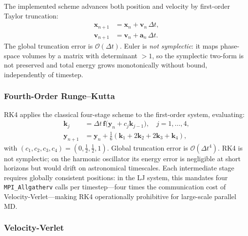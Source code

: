 \documentclass[10pt,twocolumn]{article}
\begin{document}
The implemented scheme advances both position and velocity by first-order
Taylor truncation:
\begin{align}
  \mathbf{x}_{n+1} &= \mathbf{x}_n + \mathbf{v}_n\,\Delta t, \label{eq:euler_x}\\
  \mathbf{v}_{n+1} &= \mathbf{v}_n + \mathbf{a}_n\,\Delta t. \label{eq:euler_v}
\end{align}
The global truncation error is $\mathcal{O}(\Delta t)$.
Euler is \emph{not symplectic}: it maps phase-space volumes by a matrix with
determinant $>1$, so the symplectic two-form is not preserved and total energy
grows monotonically without bound, independently of timestep.

\subsubsection{Fourth-Order Runge--Kutta}

RK4 applies the classical four-stage scheme to the first-order system,
evaluating:
\begin{align}
  \mathbf{k}_j &= \Delta t\,\mathbf{f}\bigl(\mathbf{y}_n + c_j\mathbf{k}_{j-1}\bigr),
    \quad j=1,\ldots,4, \label{eq:rk4}\\
  \mathbf{y}_{n+1} &= \mathbf{y}_n + \tfrac{1}{6}(\mathbf{k}_1
    + 2\mathbf{k}_2 + 2\mathbf{k}_3 + \mathbf{k}_4), \nonumber
\end{align}
with $(c_1,c_2,c_3,c_4)=(0,\tfrac{1}{2},\tfrac{1}{2},1)$.
Global truncation error is $\mathcal{O}(\Delta t^4)$.
RK4 is not symplectic; on the harmonic oscillator its energy error is
negligible at short horizons but would drift on astronomical timescales.
Each intermediate stage requires globally consistent positions:
in the LJ system, this mandates four \texttt{MPI\_Allgatherv} calls
per timestep---four times the communication cost of Velocity-Verlet---making
RK4 operationally prohibitive for large-scale parallel MD.

\subsubsection{Velocity-Verlet}
\label{sec:vv}
\end{document}
